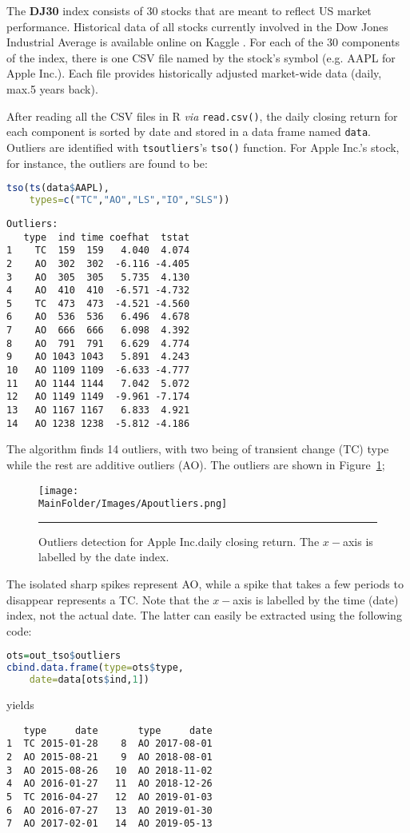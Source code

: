 \begin{Example} The \textbf{DJ30} index consists of 30 stocks that are meant to reflect US market performance. Historical data of all stocks currently involved in the Dow Jones Industrial Average is available online on Kaggle \cite{dj30}. For each of the 30 components of the index, there is one CSV file named by the stock's symbol (e.g. AAPL for Apple Inc.). Each file provides historically adjusted market-wide data (daily, max.\@ 5 years back). \par After reading all the CSV files in R \textit{via} \verb|read.csv()|, the daily closing return for each component is sorted by date and stored in a data frame named \verb|data|. Outliers are identified with \verb|tsoutliers|'s \verb|tso()| function. For Apple Inc.'s stock, for instance, the outliers are found to be:   
\begin{lstlisting}[language=R]
tso(ts(data$AAPL), 
    types=c("TC","AO","LS","IO","SLS"))
\end{lstlisting}
\begin{verbatim}
Outliers:
   type  ind time coefhat  tstat
1    TC  159  159   4.040  4.074
2    AO  302  302  -6.116 -4.405
3    AO  305  305   5.735  4.130
4    AO  410  410  -6.571 -4.732
5    TC  473  473  -4.521 -4.560
6    AO  536  536   6.496  4.678
7    AO  666  666   6.098  4.392
8    AO  791  791   6.629  4.774
9    AO 1043 1043   5.891  4.243
10   AO 1109 1109  -6.633 -4.777
11   AO 1144 1144   7.042  5.072
12   AO 1149 1149  -9.961 -7.174
13   AO 1167 1167   6.833  4.921
14   AO 1238 1238  -5.812 -4.186
\end{verbatim}
The algorithm finds 14 outliers, with two being of transient change (TC) type while the rest are additive outliers (AO). The outliers are shown in  Figure~\ref{fig:apoutlier}; 
\begin{figure}[t]
\centering
\texttt{[image: \\MainFolder/Images/Apoutliers.png]}
\caption[\small Outliers detection for Apple Inc. daily closing return]{\small Outliers detection for Apple Inc.\@ daily closing return. The $x-$axis is labelled by the date index.}
\hrule\label{fig:apoutlier}
\end{figure}
\afterpage{\FloatBarrier}
\par The isolated sharp spikes represent AO, while a spike that takes a few periods to disappear represents a TC. Note that the $x-$axis is labelled by the time (date) index, not the actual date. The latter can easily be extracted using the following code:
\begin{lstlisting}[language=R]
ots=out_tso$outliers
cbind.data.frame(type=ots$type,
    date=data[ots$ind,1])
\end{lstlisting}
yields  
\begin{verbatim}
   type     date       type     date
1  TC 2015-01-28    8  AO 2017-08-01
2  AO 2015-08-21    9  AO 2018-08-01
3  AO 2015-08-26   10  AO 2018-11-02 
4  AO 2016-01-27   11  AO 2018-12-26
5  TC 2016-04-27   12  AO 2019-01-03
6  AO 2016-07-27   13  AO 2019-01-30
7  AO 2017-02-01   14  AO 2019-05-13
\end{verbatim}
\end{Example}


